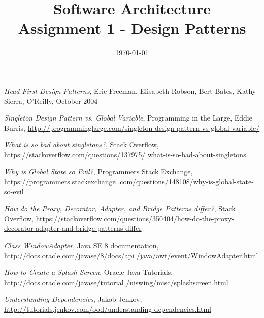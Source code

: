 \documentclass[a4paper, 11pt]{article}
\title{
	\textbf{Software Architecture}\\
    \Large{Assignment 1 - Design Patterns}
}
\date{\today}
\begin{document}
\maketitle
\newpage

\tableofcontents
\newpage





\begin{thebibliography}{10}

 \emph{Head First Design Patterns}, Eric Freeman, Elisabeth Robson, Bert Bates, Kathy Sierra, O'Reilly, October 2004

 \emph{Singleton Design Pattern vs. Global Variable}, Programming in the Large, Eddie Burris, \href{http://programminglarge.com/singleton-design-pattern-vs-global-variable/}{http://programminglarge.com/singleton-design-pattern-vs-global-variable/}

 \emph{What is so bad about singletons?}, Stack Overflow, \href{https://stackoverflow.com/questions/137975/what-is-so-bad-about-singletons}{https://stackoverflow.com/questions/137975/ what-is-so-bad-about-singletons}

 \emph{Why is Global State so Evil?}, Programmers Stack Exchange, \href{https://programmers.stackexchange.com/questions/148108/why-is-global-state-so-evil}{https://programmers.stackexchange .com/questions/148108/why-is-global-state-so-evil}

 \emph{How do the Proxy, Decorator, Adapter, and Bridge Patterns differ?}, Stack Overflow, \href{https://stackoverflow.com/questions/350404/how-do-the-proxy-decorator-adapter-and-bridge-patterns-differ}{https://stackoverflow.com/questions/350404/how-do-the-proxy-decorator-adapter-and-bridge-patterns-differ}

 \emph{Class WindowAdapter}, Java SE 8 documentation, \href{http://docs.oracle.com/javase/8/docs/api/java/awt/event/WindowAdapter.html}{http://docs.oracle.com/javase/8/docs/api /java/awt/event/WindowAdapter.html}

 \emph{How to Create a Splash Screen}, Oracle Java Tutorials, \href{http://docs.oracle.com/javase/tutorial/uiswing/misc/splashscreen.html}{http://docs.oracle.com/javase/tutorial /uiswing/misc/splashscreen.html}

 \emph{Understanding Dependencies}, Jakob Jenkov, \href{http://tutorials.jenkov.com/ood/understanding-dependencies.html}{http://tutorials.jenkov.com/ood/understanding-dependencies.html}
\end{thebibliography}
\end{document}
